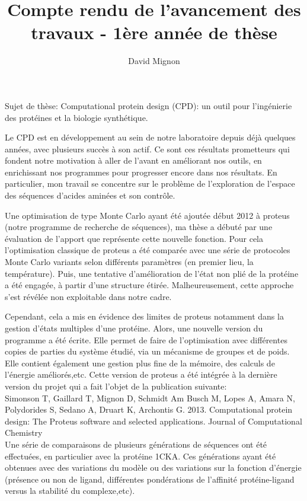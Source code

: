 \documentclass[a4paper,11pt]{article}
\title{Compte rendu de l'avancement des travaux - 1ère année de thèse}
\author{David Mignon}
\begin{document}
\maketitle


\begin{spacing}{1.0}

  Sujet de thèse:
  Computational protein design (CPD): un outil pour l'ingénierie des protéines et la biologie synthétique.
 
  Le CPD est en développement au sein de notre laboratoire depuis déjà quelques années, avec plusieurs succès à son actif.
  Ce sont ces résultats prometteurs qui fondent notre motivation à aller de l'avant en améliorant nos outils, en enrichissant 
  nos programmes pour progresser encore dans nos résultats. En particulier, mon travail se concentre sur le problème de l'exploration de l'espace des séquences d'acides aminées et son contrôle.

  Une optimisation de type Monte Carlo ayant été ajoutée début 2012 à proteus (notre programme de recherche de séquences),
  ma thèse a débuté par une évaluation de l'apport que représente cette nouvelle fonction. Pour cela l'optimisation classique de proteus a été comparée avec une série de protocoles Monte Carlo variants selon différents paramètres (en premier lieu, la température).    
  Puis, une tentative d'amélioration de l'état non plié de la protéine a été engagée, à partir d'une structure étirée. Malheureusement, cette approche s'est révélée non exploitable dans notre cadre.

  Cependant, cela a mis en évidence des limites de proteus notamment dans la gestion d'états multiples d'une protéine. Alors, une nouvelle version du programme a été écrite. Elle permet de faire de l'optimisation avec différentes copies de parties du système étudié, via un mécanisme de groupes et de poids. Elle contient également une gestion plus fine de la mémoire, des calculs de l'énergie améliorés,etc. Cette version de proteus a été intégrée à la dernière version du projet qui a fait l'objet de la publication suivante:\\ 
   
  Simonson T, Gaillard T, Mignon D, Schmidt Am Busch M, Lopes A, Amara N,
Polydorides S, Sedano A, Druart K, Archontis G. 2013. Computational protein design:
The Proteus software and selected applications. Journal of Computational Chemistry\\
    
  Une série de comparaisons de plusieurs générations de séquences ont été effectuées, en particulier avec la protéine 1CKA.
  Ces générations ayant été obtenues avec des variations du modèle ou des variations sur la fonction d'énergie (présence ou non de ligand, différentes pondérations de l'affinité protéine-ligand versus la stabilité du complexe,etc).


\end{spacing}
\end{document}
